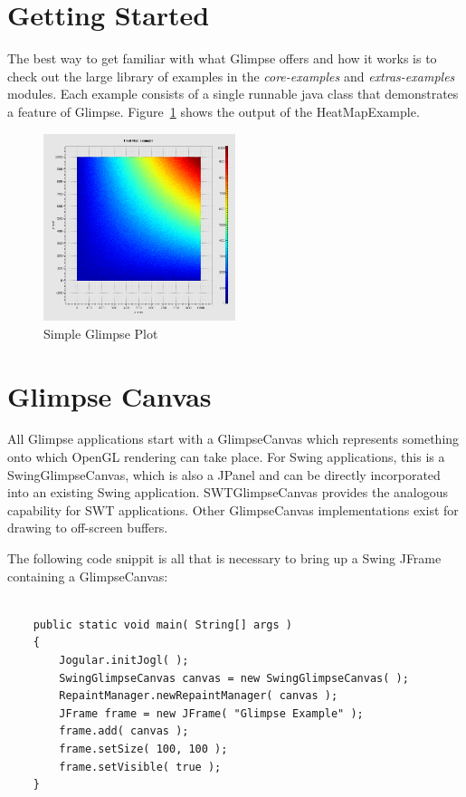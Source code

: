 \documentclass[12pt]{article}
\begin{document}
\section{Getting Started}

The best way to get familiar with what Glimpse offers and how it works is to check out the large library of examples in the \emph{core-examples} and \emph{extras-examples} modules. Each example consists of a single runnable java class that demonstrates a feature of Glimpse. Figure~\ref{simpleplot} shows the output of the HeatMapExample.

\begin{figure}
  \centering
    \includegraphics[width=0.5\textwidth]{images/Heatmap_empty.png}
  \caption{Simple Glimpse Plot}
\label{simpleplot}
\end{figure}

\section{Glimpse Canvas}

All Glimpse applications start with a GlimpseCanvas which represents something onto which OpenGL rendering can take place. For Swing applications, this is a SwingGlimpseCanvas, which is also a JPanel and can be directly incorporated into an existing Swing application. SWTGlimpseCanvas provides the analogous capability for SWT applications. Other GlimpseCanvas implementations exist for drawing to off-screen buffers.

The following code snippit is all that is necessary to bring up a Swing JFrame containing a GlimpseCanvas:

\begin{samepage}
\begin{verbatim}

    public static void main( String[] args )
    {
        Jogular.initJogl( );
        SwingGlimpseCanvas canvas = new SwingGlimpseCanvas( );
        RepaintManager.newRepaintManager( canvas );
        JFrame frame = new JFrame( "Glimpse Example" );
        frame.add( canvas );
        frame.setSize( 100, 100 );
        frame.setVisible( true );
    }

\end{verbatim}
\end{samepage}
\end{document}
